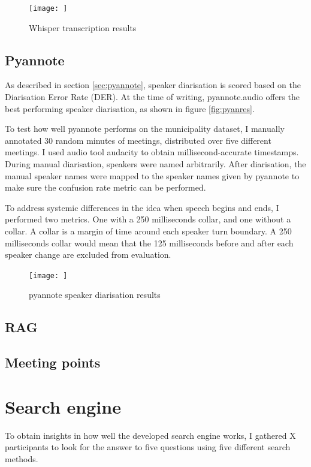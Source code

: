 \documentclass[twoside]{uva-inf-bachelor-thesis}
\begin{document}
\begin{figure}
    \centering
    \texttt{[image: ]}
    \caption{Whisper transcription results}
    \label{fig:whisperExperiment}
\end{figure}

\subsection{Pyannote}
As described in section \ref{sec:pyannote}, speaker diarisation is scored based on the Diarisation Error Rate (DER). At the time of writing, pyannote.audio offers the best performing speaker diarisation, as shown in figure \ref{fig:pyanres}. 

To test how well pyannote performs on the municipality dataset, I manually annotated 30 random minutes of meetings, distributed over five different meetings. I used audio tool audacity to obtain millisecond-accurate timestamps. During manual diarisation, speakers were named arbitrarily. After diarisation, the manual speaker names were mapped to the speaker names given by pyannote to make sure the confusion rate metric can be performed.

To address systemic differences in the idea when speech begins and ends, I performed two metrics. One with a 250 milliseconds collar, and one without a collar. 
A collar is a margin of time around each speaker turn boundary. A 250 milliseconds collar would mean that the 125 milliseconds before and after each speaker change are excluded from evaluation.

\begin{figure}
    \centering
    \texttt{[image: ]}
    \caption{pyannote speaker diarisation results}
    \label{fig:pyanExperiment}
\end{figure}

\subsection{RAG}

\subsection{Meeting points}

\section{Search engine}
To obtain insights in how well the developed search engine works, I gathered X participants to look for the answer to five questions using five different search methods.
\end{document}
